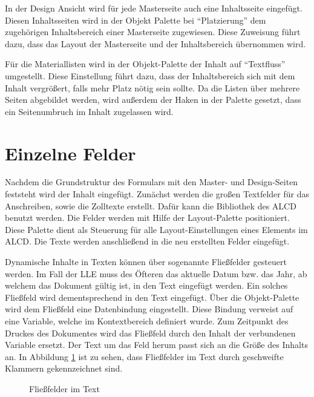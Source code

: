 In der Design Ansicht wird für jede Masterseite auch eine Inhaltsseite eingefügt. Diesen Inhaltsseiten wird in der Objekt Palette bei "`Platzierung"' dem zugehörigen Inhaltsbereich einer Masterseite zugewiesen. Diese Zuweisung führt dazu, dass das Layout der Masterseite und der Inhaltsbereich übernommen wird.

Für die Materiallisten wird in der Objekt-Palette der Inhalt auf "`Textfluss"' umgestellt. Diese Einstellung führt dazu, dass der Inhaltsbereich sich mit dem Inhalt vergrößert, falls mehr Platz nötig sein sollte. Da die Listen über mehrere Seiten abgebildet werden, wird außerdem der Haken in der Palette gesetzt, dass ein Seitenumbruch im Inhalt zugelassen wird.




\FloatBarrier
\section{Einzelne Felder}

Nachdem die Grundstruktur des Formulars mit den Master- und Design-Seiten feststeht wird der Inhalt eingefügt.
Zunächst werden die großen Textfelder für das Anschreiben, sowie die Zolltexte erstellt. Dafür kann die Bibliothek des \ac{ALCD} benutzt werden. Die Felder werden mit Hilfe der Layout-Palette positioniert. Diese Palette dient als Steuerung für alle Layout-Einstellungen eines Elements im \ac{ALCD}. Die Texte werden anschließend in die neu erstellten Felder eingefügt. 

Dynamische Inhalte in Texten können über sogenannte Fließfelder gesteuert werden. Im Fall der \ac{LLE} muss des Öfteren das aktuelle Datum bzw. das Jahr, ab welchem das Dokument gültig ist, in den Text eingefügt werden.
Ein solches Fließfeld wird dementsprechend in den Text eingefügt. Über die Objekt-Palette wird dem Fließfeld eine Datenbindung eingestellt. Diese Bindung verweist auf eine Variable, welche im Kontextbereich definiert wurde. Zum Zeitpunkt des Druckes des Dokumentes wird das Fließfeld durch den Inhalt der verbundenen Variable ersetzt. Der Text um das Feld herum passt sich an die Größe des Inhalts an. In Abbildung \ref{figdt} ist zu sehen, dass Fließfelder im Text durch geschweifte Klammern gekennzeichnet sind.

\begin{figure}[ht]
	\centering
	\caption{Fließfelder im Text}
	\label{figdt}
	
\end{figure}



